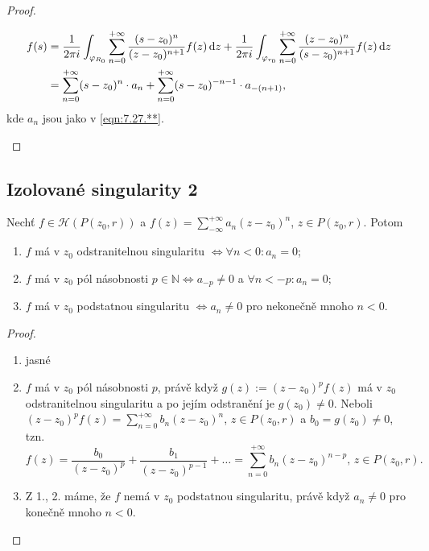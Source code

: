 \begin{proof}
\begin{enumerate}
\begin{equation}
    \begin{aligned}
        f(s)&=\frac{1}{2 \pi i}\int_{\varphi_{R_0}}\sum\limits_{n=0}^{+\infty}\frac{(s-z_0)^n}{(z-z_0)^{n+1}}f(z) \mathop{}\!\mathrm{d} z+\frac{1}{2 \pi i}\int_{\varphi_{r_0}}\sum\limits_{n=0}^{+\infty}\frac{(z-z_0)^n}{(s-z_0)^{n+1}}f(z) \mathop{}\!\mathrm{d} z \\
        &=\sum\limits_{n=0}^{+\infty}(s-z_0)^n\cdot a_n+\sum\limits_{n=0}^{+\infty}(s-z_0)^{-n-1}\cdot a_{-(n+1)},    
    \end{aligned}
\end{equation}
 kde $a_n$ jsou jako v \cref{eqn:7.27.**}.
\end{enumerate}
\end{proof}

\subsection{Izolované singularity 2}
\begin{theorem}
Nechť $f \in \mathcal{H}(P(z_0,r))$ a $f(z)=\sum\limits_{-\infty}^{+\infty}a_n(z-z_0)^n$, $z \in P(z_0,r)$. Potom
\begin{enumerate}
    \item $f$ má v $z_0$ odstranitelnou singularitu $\Leftrightarrow \forall n<0: a_n=0$; 
    \item $f$ má v $z_0$ pól násobnosti $p \in \mathbb{N}\Leftrightarrow a_{-p} \neq 0$ a $\forall n<-p: a_n=0$; 
    \item $f$ má v $z_0$ podstatnou singularitu $\Leftrightarrow a_n \neq 0$ pro nekonečně mnoho $n<0$.
\end{enumerate}
\end{theorem}

\begin{proof}
\begin{enumerate}
    \item jasné
    \item $f$ má v $z_0$ pól násobnosti $p$, právě když $g(z):=(z-z_0)^pf(z)$ má v $z_0$ odstranitelnou singularitu a po jejím odstranění je $g(z_0) \neq 0$. Neboli $(z-z_0)^pf(z)=\sum\limits_{n=0}^{+\infty}b_n(z-z_0)^n$, $z \in P(z_0,r)$ a $b_0=g(z_0) \neq 0$, tzn. 
    $$
    f(z)=\frac{b_0}{(z-z_0)^p}+\frac{b_1}{(z-z_0)^{p-1}}+ \dots=\sum\limits_{n=0}^{+\infty}b_n(z-z_0)^{n-p} \text{, } z \in P(z_0,r)\text{.}
    $$
    \item Z 1., 2. máme, že $f$ nemá v $z_0$ podstatnou singularitu, právě když $a_n \neq 0$ pro konečně mnoho $n<0$.
\end{enumerate}
\end{proof}

